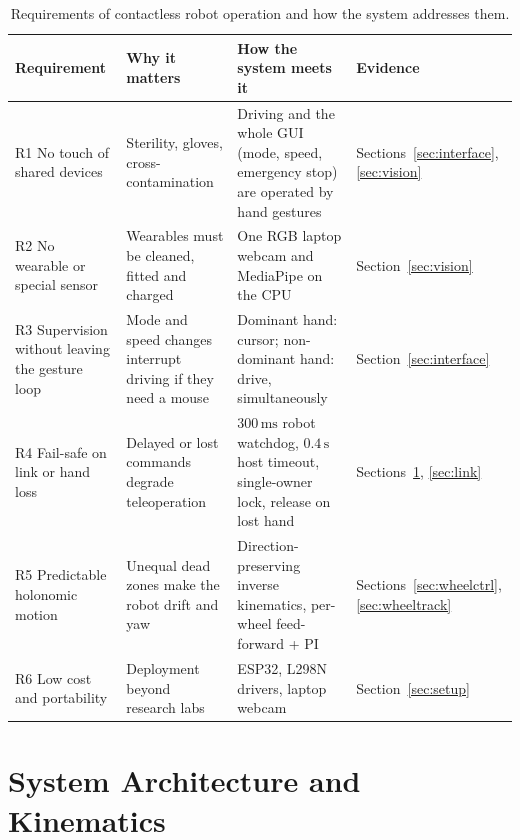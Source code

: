\documentclass[5p,twocolumn]{elsarticle}
\begin{document}
\begin{table}[!t]
\caption{Requirements of contactless robot operation and how the system addresses them.}
\label{tab:req}
\centering
\footnotesize
\setlength{\tabcolsep}{4pt}
\begin{tabular}{>{\raggedright\arraybackslash}p{}>{\raggedright\arraybackslash}p{}>{\raggedright\arraybackslash}p{}>{\raggedright\arraybackslash}p{}}
\toprule
Requirement & Why it matters & How the system meets it & Evidence \\
\midrule
R1 No touch of shared devices & Sterility, gloves, cross-contamination \cite{wachs2008,ohara2014,mewes2017} & Driving and the whole GUI (mode, speed, emergency stop) are operated by hand gestures & Sections~\ref{sec:interface}, \ref{sec:vision} \\
R2 No wearable or special sensor & Wearables must be cleaned, fitted and charged \cite{bisi2018} & One RGB laptop webcam and MediaPipe on the CPU & Section~\ref{sec:vision} \\
R3 Supervision without leaving the gesture loop & Mode and speed changes interrupt driving if they need a mouse & Dominant hand: cursor; non-dominant hand: drive, simultaneously \cite{guiard1987} & Section~\ref{sec:interface} \\
R4 Fail-safe on link or hand loss & Delayed or lost commands degrade teleoperation \cite{ferrell1965,lane2002} & $300\,\mathrm{ms}$ robot watchdog, $0.4\,\mathrm{s}$ host timeout, single-owner lock, release on lost hand & Sections~\ref{sec:arch}, \ref{sec:link} \\
R5 Predictable holonomic motion & Unequal dead zones make the robot drift and yaw & Direction-preserving inverse kinematics, per-wheel feed-forward + PI & Sections~\ref{sec:wheelctrl}, \ref{sec:wheeltrack} \\
R6 Low cost and portability & Deployment beyond research labs & ESP32, L298N drivers, laptop webcam & Section~\ref{sec:setup} \\
\bottomrule
\end{tabular}
\end{table}

\section{System Architecture and Kinematics}\label{sec:arch}
\end{document}
